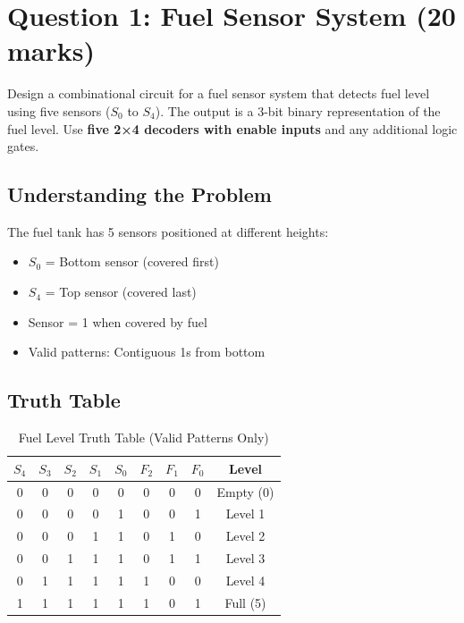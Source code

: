 \documentclass[12pt,a4paper]{article}
\begin{document}
\section{Question 1: Fuel Sensor System (20 marks)}

\begin{solutionbox}
Design a combinational circuit for a fuel sensor system that detects fuel level using five sensors ($S_0$ to $S_4$). The output is a 3-bit binary representation of the fuel level. Use \textbf{five 2×4 decoders with enable inputs} and any additional logic gates.
\end{solutionbox}

\subsection{Understanding the Problem}

The fuel tank has 5 sensors positioned at different heights:
\begin{itemize}
  \item $S_0$ = Bottom sensor (covered first)
  \item $S_4$ = Top sensor (covered last)
  \item Sensor = 1 when covered by fuel
  \item Valid patterns: Contiguous 1s from bottom
\end{itemize}

\subsection{Truth Table}

\begin{table}[H]
\centering
\begin{tabular}{ccccc|ccc|c}
\toprule
\textbf{$S_4$} & \textbf{$S_3$} & \textbf{$S_2$} & \textbf{$S_1$} & \textbf{$S_0$} & \textbf{$F_2$} & \textbf{$F_1$} & \textbf{$F_0$} & \textbf{Level} \\
\midrule
0 & 0 & 0 & 0 & 0 & 0 & 0 & 0 & Empty (0) \\
0 & 0 & 0 & 0 & 1 & 0 & 0 & 1 & Level 1 \\
0 & 0 & 0 & 1 & 1 & 0 & 1 & 0 & Level 2 \\
0 & 0 & 1 & 1 & 1 & 0 & 1 & 1 & Level 3 \\
0 & 1 & 1 & 1 & 1 & 1 & 0 & 0 & Level 4 \\
1 & 1 & 1 & 1 & 1 & 1 & 0 & 1 & Full (5) \\
\bottomrule
\end{tabular}
\caption{Fuel Level Truth Table (Valid Patterns Only)}
\end{table}
\end{document}
